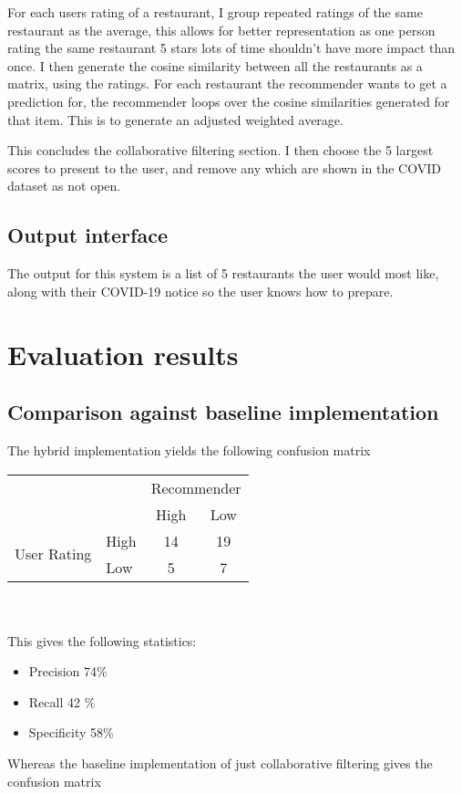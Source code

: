 \documentclass[conference]{IEEEtran}
\begin{document}
For each users rating of a restaurant, I group repeated ratings of the same restaurant as the average, this allows for better representation as one person rating the same restaurant 5 stars lots of time shouldn't have more impact than once. I then generate the cosine similarity between all the restaurants as a matrix, using the ratings. For each restaurant the recommender wants to get a prediction for, the recommender loops over the cosine similarities generated for that item. This is to generate an adjusted weighted average.

This concludes the collaborative filtering section. I then choose the 5 largest scores to present to the user, and remove any which are shown in the COVID dataset as not open.

\subsection{Output interface}

The output for this system is a list of 5 restaurants the user would most like, along with their COVID-19 notice so the user knows how to prepare.

\section{Evaluation results}

\subsection{Comparison against baseline implementation}

The hybrid implementation yields the following confusion matrix

\begin{tabular}{l|l|c|c|}
    \multicolumn{2}{c}{}         & \multicolumn{2}{c}{Recommender}            \\
    \cline{3-4}
    \multicolumn{2}{c|}{}        & High                            & Low      \\
    \cline{2-4}
    \multirow{2}{*}{User Rating} & High                            & 14  & 19 \\
    \cline{2-4}
                                 & Low                             & 5   & 7  \\
    \cline{2-4}
\end{tabular}
\\
\\
This gives the following statistics:
\begin{itemize}
    \item Precision 74\%
    \item Recall 42 \%
    \item Specificity 58\%
\end{itemize}
\vspace{2mm}
Whereas the baseline implementation of just collaborative filtering gives the confusion matrix
\end{document}
